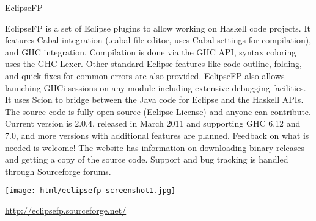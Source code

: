 \begin{hcarentry}[new]{EclipseFP}
\makeheader

EclipseFP is a set of Eclipse plugins to allow working on Haskell code projects.
It features Cabal integration (.cabal file editor, uses Cabal settings for compilation), and GHC integration. Compilation is done via the GHC API, syntax coloring uses the GHC Lexer. Other standard Eclipse features like code outline, folding, and quick fixes for common errors are also provided. EclipseFP also allows launching GHCi sessions on any module including extensive debugging facilities. It uses Scion to bridge between the Java code for Eclipse and the Haskell APIs.
The source code is fully open source (Eclipse License) and anyone can contribute. Current version is 2.0.4, released in March 2011 and supporting GHC 6.12 and 7.0, and more versions with additional features are planned. Feedback on what is needed is welcome! The website has information on downloading binary releases and getting a copy of the source code. Support and bug tracking is handled through Sourceforge forums.

\begin{center}
\texttt{[image: html/eclipsefp-screenshot1.jpg]}
\end{center}

\FurtherReading 
\url{http://eclipsefp.sourceforge.net/}
\end{hcarentry}
